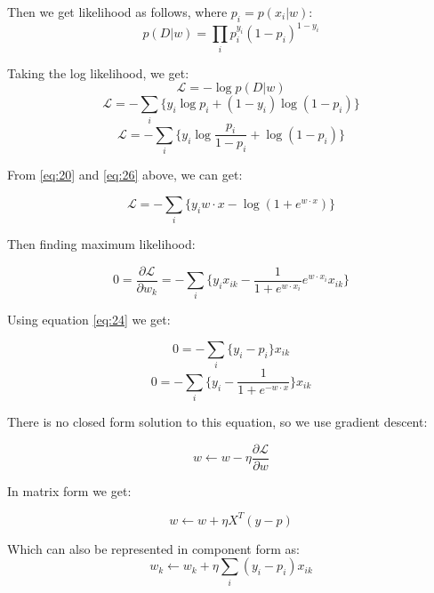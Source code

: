 Then we get likelihood as follows, where $p_i = p(x_i|w)$:
\begin{equation}
p(D|w) = \prod_i p_i^{y_i} (1-p_i)^{1-y_i}
\end{equation}

Taking the log likelihood, we get:
\begin{equation}
\mathcal{L} = -\log p(D|w)
\end{equation}
\begin{equation}
\mathcal{L} = -\sum_i \{y_i \log p_i + (1-y_i)\log (1-p_i)\}
\end{equation}
\begin{equation}
\mathcal{L} = -\sum_i \{y_i \log \frac{p_i}{1-p_i} + \log (1-p_i)\}
\end{equation}

From \ref{eq:20} and \ref{eq:26} above, we can get:

\begin{equation}
\mathcal{L} = -\sum_i \{y_i w \cdot x - \log(1+e^{w \cdot x}) \}
\end{equation}

Then finding maximum likelihood:

\begin{equation}
0 = \frac{\partial\mathcal{L}}{\partial w_k} = -\sum_i \{y_i x_{ik} - \frac{1}{1+e^{w \cdot x_i}} e^{w \cdot x_i} x_{ik} \}
\end{equation}

Using equation \ref{eq:24} we get:

\begin{equation}
0 = -\sum_i \{ y_i - p_i \} x_{ik}
\end{equation}
\begin{equation}
0 = -\sum_i \{ y_i - \frac{1}{1 + e^{-w \cdot x}} \} x_{ik}
\end{equation}

There is no closed form solution to this equation, so we use gradient descent:

\begin{equation}
w \leftarrow w - \eta \frac{\partial\mathcal{L}}{\partial w}
\end{equation}

In matrix form we get:

\begin{equation}
w \leftarrow w + \eta X^T (y - p)
\end{equation}

Which can also be represented in component form as:
\begin{equation}
w_{k} \leftarrow w_{k} + \eta \sum_i (y_i - p_i) x_{ik}
\end{equation}


